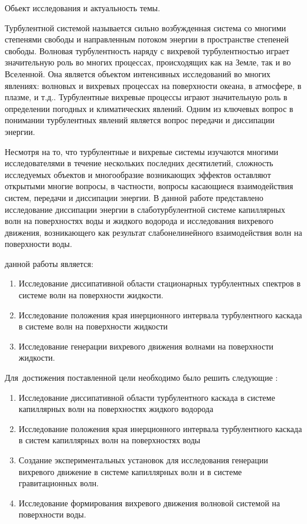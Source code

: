 
{\actuality}Обьект исследования и актуальность темы.

Турбулентной системой называется сильно возбужденная система со многими степенями свободы и направленным потоком энергии в пространстве степеней свободы. Волновая турбулентность наряду с вихревой турбулентностью играет значительную роль во многих процессах, происходящих как на Земле, так и во Вселенной. Она является объектом  интенсивных исследований во многих явлениях: волновых и вихревых процессах на поверхности океана, в атмосфере, в плазме, и т.д.. Турбулентные вихревые процессы играют значительную роль в определении погодных и климатических явлений. Одним из ключевых вопрос в понимании турбулентных явлений является вопрос передачи и диссипации энергии. 

Несмотря на то, что турбулентные и вихревые системы изучаются многими исследователями в течение нескольких последних десятилетий, сложность исследуемых объектов и многообразие возникающих эффектов оставляют открытыми многие вопросы, в частности, вопросы касающиеся взаимодействия систем, передачи и диссипации энергии. 
В данной работе представлено исследование диссипации энергии в слаботурбулентной системе капиллярных волн на поверхностях воды и жидкого водорода и исследования вихревого движения, возникающего как результат слабонелинейного взаимодействия волн на поверхности воды.

{\aim} данной работы является: 
\begin{enumerate}
	\item Исследование диссипативной области стационарных турбулентных спектров в системе волн на поверхности жидкости.
	\item Исследование положения края инерционного интервала турбулентного каскада в системе волн на поверхности жидкости
	\item Исследование генерации вихревого движения волнами на поверхности жидкости.
\end{enumerate}

Для~достижения поставленной цели необходимо было решить следующие {\tasks}:
\begin{enumerate}
	\item Исследование диссипативной области турбулентного каскада в системе капиллярных волн на поверхностях жидкого водорода
	\item Исследование положения края инерционного интервала турбулентного каскада в систем капиллярных волн на поверхностях воды
	\item Создание экспериментальных установок для исследования генерации вихревого движение в системе капиллярных волн и в системе гравитационных волн.
	\item Исследование формирования вихревого движения волновой системой на поверхности воды.
\end{enumerate}

